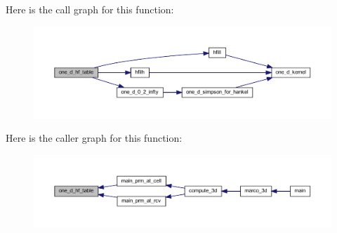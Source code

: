 Here is the call graph for this function\+:
\nopagebreak
\begin{figure}[H]
\begin{center}
\leavevmode
\includegraphics[width=350pt]{Marco_8f90_a70d6bf0b4adeb475f694e6aaa1c9582f_cgraph}
\end{center}
\end{figure}
Here is the caller graph for this function\+:
\nopagebreak
\begin{figure}[H]
\begin{center}
\leavevmode
\includegraphics[width=350pt]{Marco_8f90_a70d6bf0b4adeb475f694e6aaa1c9582f_icgraph}
\end{center}
\end{figure}
\mbox{\label{Marco_8f90_a9d38006ae4142553da9eed59f368bed7}} 
